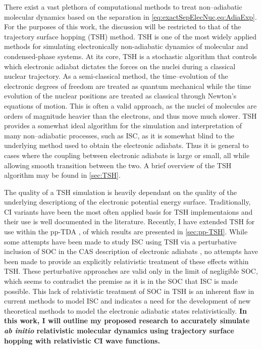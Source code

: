 There exist a vast plethora of computational methods to treat non--adiabatic
molecular dynamics based on the separation in
\cref{eq:exactSepElecNuc,eq:AdiaExp}. For the purposes of this work, the
discussion will be restricted to that of the trajectory surface hopping (TSH)
method.  TSH is one of the most widely applied methods for simulating
electronically non-adiabatic dynamics of molecular and condensed-phase
systems.\cite{Barbatti11_1759, Tavernelli14_62, Tully12_22A301, Tully98_407,
Hynes14_97} At its core, TSH is a stochastic algorithm that controls which
electronic adiabat dictates the forces on the nuclei during a classical nuclear
trajectory.\cite{Preston71_562} As a semi-classical method, the time--evolution
of the electronic degrees of freedom are treated as quantum mechanical while the
time evolution of the nuclear positions are treated as classical through
Newton's equations of motion. 
This is often a valid approach, as the nuclei of molecules are orders of
magnitude heavier than the electrons, and thus move much slower. TSH provides a
somewhat ideal algorithm for the simulation and interpretation of many
non--adiabatic processes, such as ISC, as it is somewhat blind to the underlying
method used to obtain the electronic adiabats. Thus it is general to cases where
the coupling between electronic adiabats is large or small, all while allowing
smooth transition between the two. A brief overview of the TSH algorithm may be
found in \cref{sec:TSH}. 


The quality of a TSH simulation is heavily dependant on the quality of the
underlying descriptiong of the electronic potential energy surface.
Traditionally, CI variants have been the most often applied basis for TSH
implementaions and their use is well documented in the literature.  Recently, I
have extended TSH for use within the pp-TDA \cite{DBWY16_Submitted1}, of which
results are presented in \cref{sec:pp-TSH}.
While some attempts have been made to study ISC using TSH via
a perturbative inclusion of SOC in the CAS description of electronic adiabats 
\cite{Thiel14_JCP124101}, no attempts have been made to provide an explicitly
relativistic treatment of these effects within TSH. These perturbative
approaches are valid only in the limit of negligible SOC, which seems to
contradict the premise as it is in the SOC that ISC is made possible. This
lack of relativistic treatment of SOC in TSH is an inherent flaw in current
methods to model ISC and indicates a need for the development of new
theoretical methods to model the electronic adiabatic states relativistically.
{\bf 
In this work, I will outline my proposed research to accurately simulate
\emph{ab initio} relativistic molecular dynamics using trajectory surface
hopping with relativistic CI wave functions.
}


